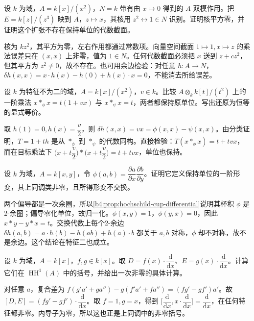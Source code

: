 \begin{optionalexercise}\label{b4:ex:12-square-zero-extension}
	设 \(k\) 为域，\(A=k[x]/(x^2)\)，\(N=k\) 带有由 \(x\mapsto0\) 得到的 \(A\) 双模作用。把 \(E=k[z]/(z^3)\) 映到 \(A\)，\(z\mapsto x\)，其核用 \(z^2\leftrightarrow1\in N\) 识别。证明核平方零，并证明这个扩张不存在保持单位的代数截面。
\end{optionalexercise}
\begin{solution}
	核为 \(kz^2\)，其平方为零，左右作用都通过常数项。向量空间截面 \(1\mapsto1,x\mapsto z\) 的乘法误差只在 \((x,x)\) 上非零，值为 \(1\in N\)。任何代数截面必须把 \(x\) 送到 \(z+c z^2\)，但其平方为 \(z^2\ne0\)，故不存在。也可用余边检验：对任意 \(h:A\to N\)，\(\delta h(x,x)=x\cdot h(x)-h(0)+h(x)\cdot x=0\)，不能消去所给误差。
\end{solution}

\begin{optionalexercise}\label{b4:ex:12-coordinate-change}
	设 \(k\) 为特征不为二的域，\(A=k[x]/(x^2)\)，\(v\in k\)。比较 \(A\otimes_k k[t]/(t^2)\) 上的一阶乘法 \(x*_\phi x=t(1+vx)\) 与 \(x*_\psi x=t\)，两者都保持原单位。写出还原为恒等的显式等价。
\end{optionalexercise}
\begin{solution}
	取 \(h(1)=0,h(x)=\dfrac v2\)，则 \(\delta h(x,x)=vx=\phi(x,x)-\psi(x,x)\)。由分类证明，\(T=1+th\) 是从 \(*_\phi\) 到 \(*_\psi\) 的代数同构。直接检验：\(T(x*_\phi x)=t+tvx\)，而在目标乘法下 \(\bigl(x+t\dfrac v2\bigr)*\bigl(x+t\dfrac v2\bigr)=t+tvx\)，单位也保持。
\end{solution}

\begin{optionalexercise}\label{b4:ex:12-noncommutative-deformation}
	设 \(k\) 为域，\(A=k[x,y]\)，令 \(\phi(a,b)=\dfrac{\partial a}{\partial x}\dfrac{\partial b}{\partial y}\)。证明它定义保持单位的一阶形变，其上同调类非零，且所得形变不交换。
\end{optionalexercise}
\begin{solution}
	两个偏导都是一次余圈，所以\cref{b4:prop:hochschild-cup-differential}说明其杯积 \(\phi\) 是\(2\)-余圈；偏导零化单位，故归一化。\(\phi(x,y)=1\)，\(\phi(y,x)=0\)，因此 \(x*y-y*x=t\)。交换代数上每个\(2\)-余边 \(\delta h(a,b)=a\cdot h(b)-h(ab)+h(a)\cdot b\) 都关于 \(a,b\) 对称，\(\phi\) 却不对称，故不是余边。这个结论在特征二也成立。
\end{solution}

\begin{optionalexercise}\label{b4:ex:12-derivation-bracket}
	设 \(k\) 为域，\(A=k[x]\)，\(f,g\in k[x]\)。取 \(D=f(x)\cdot\dfrac{\mathrm{d}}{\mathrm{d}x}\)、\(E=g(x)\cdot\dfrac{\mathrm{d}}{\mathrm{d}x}\)。计算它们在 \(\operatorname{HH}^1(A)\) 中的括号，并给出一次非零的具体计算。
\end{optionalexercise}
\begin{solution}
	对任意 \(a\)，复合差为 \(f(g'a'+ga'')-g(f'a'+fa'')=(fg'-gf')a'\)。故 \([D,E]=(fg'-gf')\cdot\dfrac{\mathrm{d}}{\mathrm{d}x}\)。取 \(f=1,g=x\)，得到 \(\bigl[\dfrac{\mathrm{d}}{\mathrm{d}x},x\cdot\dfrac{\mathrm{d}}{\mathrm{d}x}\bigr]=\dfrac{\mathrm{d}}{\mathrm{d}x}\)，在任何特征都非零。内导子为零，所以这也正是上同调中的非零括号。
\end{solution}


